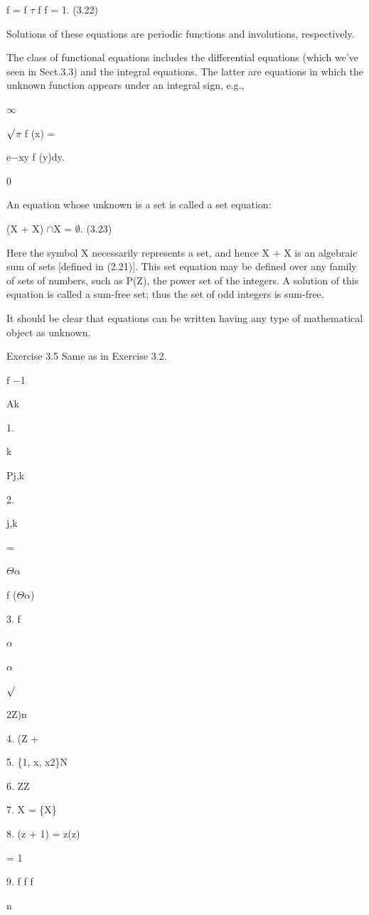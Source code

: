 \documentclass[11pt]{article}
\theoremstyle{plain}
\theoremstyle{definition}
\begin{document}
f = f $\tau$ f f = 1. (3.22)

Solutions of these equations are periodic functions and involutions, respectively.

The class of functional equations includes the differential equations (which we've seen in Sect.3.3) and the integral equations. The latter are equations in which the unknown function appears under an integral sign, e.g.,

$\infty$

$\surd$$\pi$ f (x) =

e$-$xy f (y)dy.

0

An equation whose unknown is a set is called a set equation:

(X + X) $\cap$X = $\emptyset$. (3.23)

Here the symbol X necessarily represents a set, and hence X + X is an algebraic sum of sets [defined in (2.21)]. This set equation may be defined over any family of sets of numbers, such as P(Z), the power set of the integers. A solution of this equation is called a sum-free set; thus the set of odd integers is sum-free.

It should be clear that equations can be written having any type of mathematical object as unknown.

Exercise 3.5 Same as in Exercise 3.2.

f $-$1

Ak

1.

k

Pj,k

2.

j,k

=

$\Theta$$\alpha$

f ($\Theta$$\alpha$)

3. f

$\alpha$

$\alpha$

$\surd$

2Z)n

4. (Z +

5. \{1, x, x2\}N

6. ZZ

7. X = \{X\}

8. (z + 1) = z(z)

= 1

9. f f \textperiodcentered{} \textperiodcentered{} \textperiodcentered{} f

n
\end{document}
